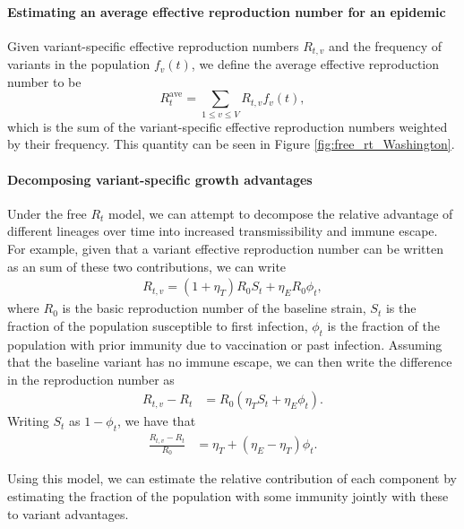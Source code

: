 \documentclass[11pt,oneside,letterpaper]{article}
\begin{document}
\paragraph{Estimating an average effective reproduction number for an epidemic}

Given variant-specific effective reproduction numbers $R_{t,v}$ and the frequency of variants in the population $f_{v}(t)$, we define the average effective reproduction number to be
\begin{equation}
  R_{t}^{\text{ave}} = \sum_{1\leq v \leq V} R_{t,v}f_{v}(t),
\end{equation}
which is the sum of the variant-specific effective reproduction numbers weighted by their frequency. This quantity can be seen in Figure \ref{fig:free_rt_Washington}.

\paragraph{Decomposing variant-specific growth advantages}%

Under the free $R_{t}$ model, we can attempt to decompose the relative advantage of different lineages over time into increased transmissibility and immune escape. For example, given that a variant effective reproduction number can be written as an sum of these two contributions, we can write
\begin{align*}
  R_{t,v} = (1+\eta_{T}) R_{0} S_{t} + \eta_{E} R_{0} \phi_{t},
\end{align*}
where $R_{0}$ is the basic reproduction number of the baseline strain, $S_{t}$ is the fraction of the population susceptible to first infection, $\phi_{t}$ is the fraction of the population with prior immunity due to vaccination or past infection. Assuming that the baseline variant has no immune escape, we can then write the difference in the reproduction number as
\begin{align*}
  R_{t,v} - R_{t} &= R_{0} (\eta_{T} S_{t} + \eta_{E} \phi_{t}).
\end{align*}
Writing $S_{t}$ as $1 - \phi_{t}$, we have that
\begin{align*}
  \frac{R_{t,v}-R_{t}}{R_{0}} &= \eta_{T} + (\eta_{E} - \eta_{T})\phi_{t}.
\end{align*}

Using this model, we can estimate the relative contribution of each component by estimating the fraction of the population with some immunity jointly with these to variant advantages.
\end{document}
